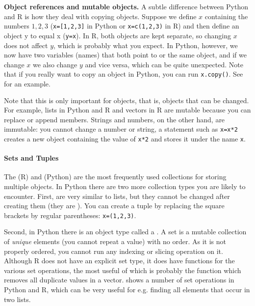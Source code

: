\begin{feature}\textbf{Object references and mutable objects.}
  A subtle difference between Python and R is how they deal with copying objects.
  Suppose we define $x$ containing the numbers $1,2,3$ (\verb|x=[1,2,3]| in Python or \verb|x=c(1,2,3)| in R)
  and then define an object y to equal x (\verb|y=x|).
  In R, both objects are kept separate, so changing $x$ does not affect $y$,
  which is probably what you expect.
  In Python, however, we now have two variables (names) that both point to or  the same object,
  and if we change $x$ we also change $y$ and vice versa, which can be quite unexpected.
  Note that if you really want to copy an object in Python, you can run \verb|x.copy()|.
  See  for an example.

  Note that this is only important for  objects, that is,
  objects that can be changed.
  For example, lists in Python and R and vectors in R are mutable because you can replace or append members.
  Strings and numbers, on the other hand, are immutable:
  you cannot change a number or string, a statement such as \verb|x=x*2| creates a new object containing the value of \verb|x*2| and stores it under the name \verb|x|.

\end{feature}
  

\paragraph{Sets and Tuples}
The  (R) and  (Python) are the most frequently used collections
for storing multiple objects. 
In Python there are two more collection types you are likely to encounter.
First,  are very similar to lists, but they cannot be changed after creating them
(they are ).
You can create a tuple by replacing the square brackets by regular parentheses:
\verb|x=(1,2,3)|. 

Second, in Python there is an object type called a .
A set is a mutable collection of \emph{unique} elements (you cannot repeat a value) with
no order. As it is not properly ordered, you cannot run any indexing
or slicing operation on it.
Although R does not have an explicit set type,
it does have functions for the various set operations,
the most useful of which is probably the function  which removes all duplicate values in a vector.
 shows a number of set operations in Python and R,
which can be very useful for e.g. finding all elements that occur in two lists.

